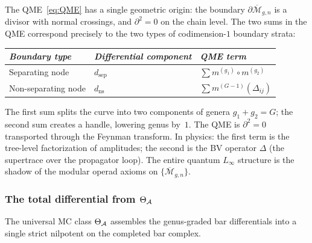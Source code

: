 \begin{remark}[The QME as $\partial^2 = 0$ on moduli]
\label{rem:qme-boundary-squared}
The QME~\eqref{eq:QME} has a single geometric origin: the boundary
$\partial\overline{\mathcal{M}}_{g,n}$ is a divisor with normal
crossings, and $\partial^2 = 0$ on the chain level.  The two sums
in the QME correspond precisely to the two types of codimension-$1$
boundary strata:

\smallskip
\begin{center}
\renewcommand{\arraystretch}{1.3}
\begin{tabular}{lll}
\toprule
\emph{Boundary type} & \emph{Differential component}
  & \emph{QME term} \\
\midrule
Separating node & $d_{\mathrm{sep}}$
  & $\sum m^{(g_1)} \circ m^{(g_2)}$ \\
Non-separating node & $d_{\mathrm{ns}}$
  & $\sum m^{(G-1)}(\Delta_{ij})$ \\
\bottomrule
\end{tabular}
\end{center}
\smallskip

\noindent
The first sum splits the curve into two components of genera
$g_1 + g_2 = G$; the second sum creates a handle, lowering genus by~$1$.
The QME is $\partial^2 = 0$ transported through the Feynman transform.
In physics: the first term is the tree-level factorization of
amplitudes; the second is the BV operator $\Delta$ (the supertrace
over the propagator loop).  The entire quantum $L_\infty$ structure
is the shadow of the modular operad axioms on
$\{\overline{\mathcal{M}}_{g,n}\}$.
\end{remark}

\subsubsection{The total differential from
\texorpdfstring{$\Theta_{\mathcal{A}}$}{Theta-A}}
\label{subsubsec:total-differential-from-theta}

The universal MC class $\Theta_{\mathcal{A}}$ assembles the genus-graded bar
differentials into a single strict nilpotent on the completed bar
complex.

